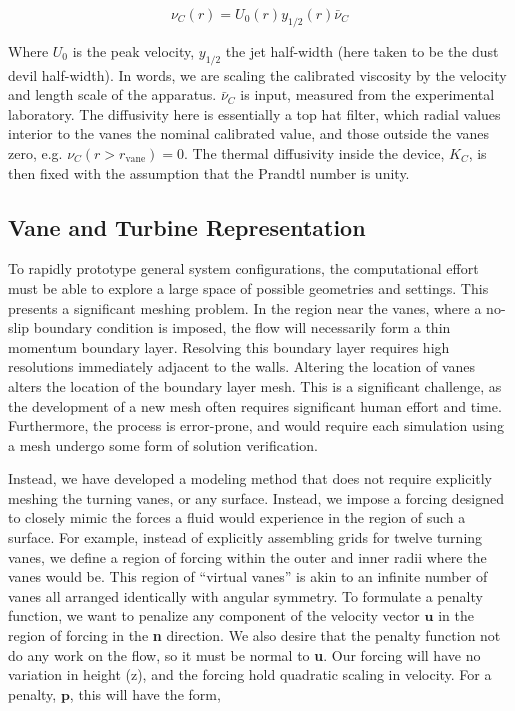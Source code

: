 \begin{equation}
 \nu_C(r) = U_0(r) y_{1/2}(r) \bar \nu_C
\end{equation}

Where $U_0$ is the peak velocity, $y_{1/2}$ the jet half-width (here
taken to be the dust devil half-width). In words, we are scaling the
calibrated viscosity by the velocity and length scale of the
apparatus. $\bar \nu_C $ is input, measured from the experimental
laboratory.  The diffusivity here is essentially a top hat filter, which
radial values interior to the vanes the nominal calibrated value, and
those outside the vanes zero, e.g. $\nu_C(r>r_{\text{vane}})=0$. The
thermal diffusivity inside the device, $K_C$, is then fixed with the
assumption that the Prandtl number is unity.  

\subsection{Vane and Turbine Representation}

To rapidly prototype general system configurations, the
computational effort must be able to explore a large space of possible
geometries and settings. This presents a significant meshing
problem. In the region near the vanes, where a no-slip boundary
condition is imposed, the flow will necessarily form a thin momentum
boundary layer. Resolving this boundary layer requires high resolutions
immediately adjacent to the walls. Altering the location of vanes
alters the location of the boundary layer mesh. This is a significant
challenge, as the development of a new mesh often requires significant
human effort and time. Furthermore, the process is error-prone, 
and would require each simulation using a mesh undergo 
some form of solution verification. 

Instead, we have developed a modeling method that does not require
explicitly meshing the turning vanes, or any surface. Instead, we impose
a forcing designed to closely mimic the forces a fluid would experience
in the region of such a surface. For example, instead of explicitly
assembling grids for twelve turning vanes, we define a region of forcing
within the 
outer and inner radii where the vanes would be. This region of ``virtual
vanes'' is akin to an infinite number of vanes all arranged identically
with angular symmetry. To formulate a penalty function, we want to
penalize any component of the velocity vector $\textbf{u}$ in the region
of forcing in the \textbf{n} direction. We also desire that the penalty
function not do any work on the flow, so it must be normal to
\textbf{u}. Our forcing will have no variation in height (z), and the
forcing hold quadratic scaling in velocity. For a penalty,
$\textbf{p}$, this will have the form,   


